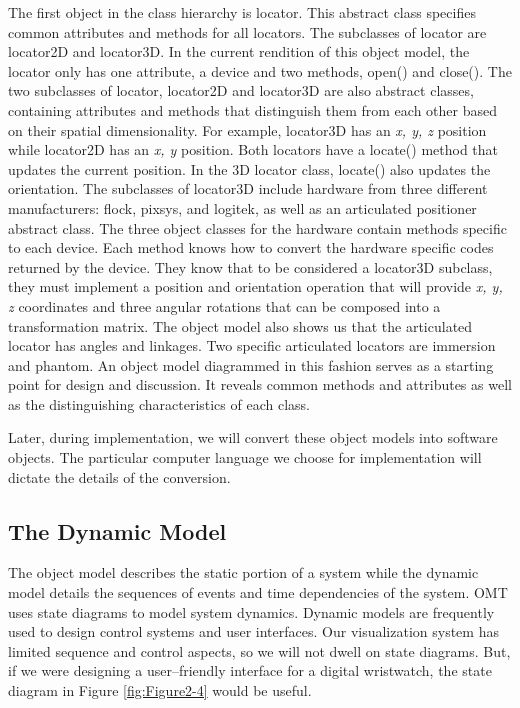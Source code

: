 The first object in the class hierarchy is locator. This abstract class specifies common attributes and methods for all locators. The subclasses of locator are locator2D and locator3D. In  the current rendition of this object model, the locator only has one attribute, a device and two methods, open() and close(). The two subclasses of locator, locator2D and locator3D are also abstract classes, containing attributes and methods that distinguish them from each other based on their spatial dimensionality. For example, locator3D has an \emph{x, y, z} position while locator2D has an \emph{x, y} position. Both locators have a locate() method that updates the current position. In the 3D locator class, locate() also updates the orientation. The subclasses of locator3D include hardware from three different manufacturers: flock, pixsys, and logitek, as well as an articulated positioner abstract class. The three object classes for the hardware contain methods specific to each device. Each method knows how to convert the hardware specific codes returned by the device. They know that to be considered a locator3D subclass, they must implement a position and orientation operation that will provide \emph{x, y, z} coordinates and three angular rotations that can be composed into a transformation matrix. The object model also shows us that the articulated locator has angles and linkages. Two specific articulated locators are immersion and phantom. An object model diagrammed in this fashion serves as a starting point for design and discussion. It reveals common methods and attributes as well as the distinguishing characteristics of each class.

Later, during implementation, we will convert these object models into software objects. The particular computer language we choose for implementation will dictate the details of the conversion.

\subsection{The Dynamic Model}

The object model describes the static portion of a system while the dynamic model details the sequences of events and time dependencies of the system. OMT uses state diagrams to model system dynamics. Dynamic models are frequently used to design control systems and user interfaces. Our visualization system has limited sequence and control aspects, so we will not dwell on state diagrams. But, if we were designing a user--friendly interface for a digital wristwatch, the state diagram in Figure \ref{fig:Figure2-4} would be useful.

